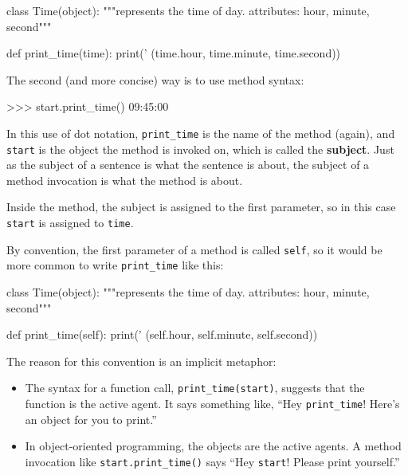 \beforeverb
\begin{pycode}
class Time(object):
    """represents the time of day.
       attributes: hour, minute, second"""

    def print_time(time):
        print('%
              (time.hour, time.minute, time.second))
\end{pycode}
\afterverb
%


The second (and more concise) way is to use method syntax:


\beforeverb
\begin{pyinterpreter}
>>> start.print_time()
09:45:00
\end{pyinterpreter}
\afterverb
%
In this use of dot notation, \verb"print_time" is the name of the
method (again), and {\tt start} is the object the method is
invoked on, which is called the {\bf subject}.  Just as the
subject of a sentence is what the sentence is about, the subject
of a method invocation is what the method is about.


Inside the method, the subject is assigned to the first
parameter, so in this case {\tt start} is assigned
to {\tt time}.


By convention, the first parameter of a method is
called {\tt self}, so it would be more common to write
\verb"print_time" like this:

\beforeverb
\begin{pycode}
class Time(object):
    """represents the time of day.
       attributes: hour, minute, second"""

    def print_time(self):
        print('%
              (self.hour, self.minute, self.second))
\end{pycode}
\afterverb
%
The reason for this convention is an implicit metaphor:


\begin{itemize}

\item The syntax for a function call, \verb"print_time(start)",
  suggests that the function is the active agent.  It says something
  like, ``Hey \verb"print_time"!  Here's an object for you to print.''

\item In object-oriented programming, the objects are the active
  agents.  A method invocation like \verb"start.print_time()" says
  ``Hey {\tt start}!  Please print yourself.''

\end{itemize}

